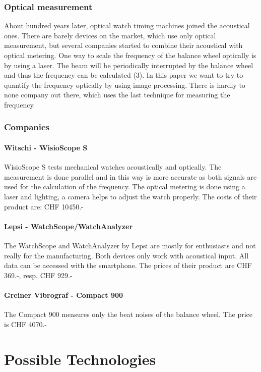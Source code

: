 \documentclass[12pt, a4paper]{report}
\begin{document}
\subsection{Optical measurement}
About hundred years later, optical watch timing machines joined the acoustical ones. There are barely devices on the market, which use only optical measurement, but several companies started to combine their acoustical with optical metering. One way to scale the frequency of the balance wheel optically is by using a laser. The beam will be periodically interrupted by the balance wheel and thus the frequency can be calculated (3). In this paper we want to try to quantify the frequency optically by using image processing. There is hardly to none company out there, which uses the last technique for measuring the frequency.

\subsection{Companies}
\subsubsection{Witschi - WisioScope S}
WisioScope S tests mechanical watches acoustically and optically. The measurement is done parallel and in this way is more accurate as both signals are used for the calculation of the frequency.
The optical metering is done using a laser and lighting, a camera helps to adjust the watch properly. The costs of their product are: CHF 10450.-

\subsubsection{Lepsi - WatchScope/WatchAnalyzer}
The WatchScope and WatchAnalyzer by Lepsi are mostly for enthusiasts and not really for the manufacturing. Both devices only work with acoustical input. All data can be accessed with the smartphone. The prices of their product are CHF 369.-, resp. CHF 929.-

\subsubsection{Greiner Vibrograf - Compact 900}
The Compact 900 measures only the beat noises of the balance wheel. The price is CHF 4070.-

\chapter {Possible Technologies}
\end{document}
